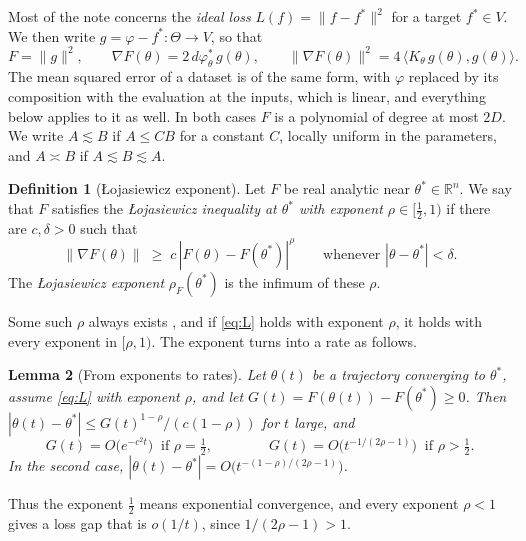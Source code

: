 \documentclass[11pt]{article}
\newtheorem{lemma}{Lemma}
\theoremstyle{definition}
\newtheorem{definition}[lemma]{Definition}
\theoremstyle{remark}
\newcommand{\R}{\mathbb{R}}
\newcommand{\ip}[2]{\langle #1,#2\rangle}
\begin{document}
Most of the note concerns the \emph{ideal loss} $L(f)=\|f-f^*\|^2$ for a target $f^*\in V$. We then write $g=\varphi-f^*\colon\Theta\to V$, so that
\begin{equation}\label{eq:ideal}
F=\|g\|^2,\qquad\nabla F(\theta)=2\,d\varphi_\theta^*\,g(\theta),\qquad\|\nabla F(\theta)\|^2=4\,\ip{K_\theta\,g(\theta)}{g(\theta)}.
\end{equation}
The mean squared error of a dataset is of the same form, with $\varphi$ replaced by its composition with the evaluation at the inputs, which is linear, and everything below applies to it as well. In both cases $F$ is a polynomial of degree at most $2D$. We write $A\lesssim B$ if $A\le CB$ for a constant $C$, locally uniform in the parameters, and $A\asymp B$ if $A\lesssim B\lesssim A$.

\begin{definition}[{\L}ojasiewicz exponent]\label{def:exponent}
Let $F$ be real analytic near $\theta^*\in\R^n$. We say that $F$ satisfies the \emph{{\L}ojasiewicz inequality at $\theta^*$ with exponent $\rho\in[\frac12,1)$} if there are $c,\delta>0$ such that
\begin{equation}\tag{\L}\label{eq:L}
\|\nabla F(\theta)\|\;\ge\;c\,|F(\theta)-F(\theta^*)|^{\rho}\qquad\text{whenever }|\theta-\theta^*|<\delta .
\end{equation}
The \emph{{\L}ojasiewicz exponent} $\rho_F(\theta^*)$ is the infimum of these $\rho$.
\end{definition}

Some such $\rho$ always exists \cite{Loj63}, and if \eqref{eq:L} holds with exponent $\rho$, it holds with every exponent in $[\rho,1)$. The exponent turns into a rate as follows.

\begin{lemma}[From exponents to rates]\label{lem:rates}
Let $\theta(t)$ be a trajectory converging to $\theta^*$, assume \eqref{eq:L} with exponent $\rho$, and let $G(t)=F(\theta(t))-F(\theta^*)\ge0$. Then $|\theta(t)-\theta^*|\le G(t)^{1-\rho}/(c(1-\rho))$ for $t$ large, and
\[
G(t)=O\big(e^{-c^2t}\big)\ \text{ if }\rho=\tfrac12,\qquad\qquad G(t)=O\big(t^{-1/(2\rho-1)}\big)\ \text{ if }\rho>\tfrac12 .
\]
In the second case, $|\theta(t)-\theta^*|=O\big(t^{-(1-\rho)/(2\rho-1)}\big)$.
\end{lemma}

Thus the exponent $\frac12$ means exponential convergence, and every exponent $\rho<1$ gives a loss gap that is $o(1/t)$, since $1/(2\rho-1)>1$.
\end{document}
